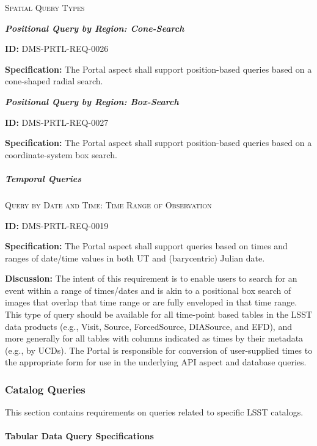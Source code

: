 \documentclass[SE,toc]{lsstdoc}
\begin{document}
\textsc{Spatial Query Types}

\textbf{\textit{Positional Query by Region: Cone-Search}}

\label{DMS-PRTL-REQ-0026}
\textbf{ID:} DMS-PRTL-REQ-0026

\textbf{Specification:}
The Portal aspect shall support position-based queries based on a cone-shaped radial search.

\textbf{\textit{Positional Query by Region: Box-Search}}

\label{DMS-PRTL-REQ-0027}
\textbf{ID:} DMS-PRTL-REQ-0027

\textbf{Specification:}
The Portal aspect shall support position-based queries based on a coordinate-system box search.

\subparagraph{Temporal Queries}\hfill  %

\textsc{Query by Date and Time: Time Range of Observation}

\label{DMS-PRTL-REQ-0019}
\textbf{ID:} DMS-PRTL-REQ-0019

\textbf{Specification:}
The Portal aspect shall support queries based on times and ranges of date/time values in both UT and (barycentric) Julian date.

\textbf{Discussion:}
The intent of this requirement is to enable users to search for an event within a range of times/dates and is akin to a positional box search of images that overlap that time range or are fully enveloped in that time range.
This type of query should be available for all time-point based tables in the LSST data products (e.g., Visit, Source, ForcedSource, DIASource, and EFD), and more generally for all tables with columns indicated as times by their metadata (e.g., by UCDs).
The Portal is responsible for conversion of user-supplied times to the appropriate form for use in the underlying API aspect and database queries.

\subsubsection{Catalog Queries}

This section contains requirements on queries related to specific LSST catalogs.

\paragraph{Tabular Data Query Specifications}\hfill  %
\end{document}
